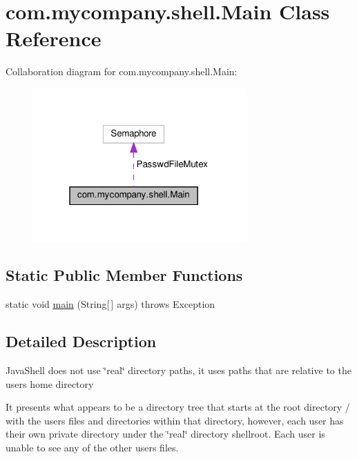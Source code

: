 \hypertarget{classcom_1_1mycompany_1_1shell_1_1Main}{}\section{com.\+mycompany.\+shell.\+Main Class Reference}
\label{classcom_1_1mycompany_1_1shell_1_1Main}


Collaboration diagram for com.\+mycompany.\+shell.\+Main\+:\nopagebreak
\begin{figure}[H]
\begin{center}
\leavevmode
\includegraphics[width=232pt]{classcom_1_1mycompany_1_1shell_1_1Main__coll__graph}
\end{center}
\end{figure}
\subsection*{Static Public Member Functions}
\begin{DoxyCompactItemize}
\item 
static void \hyperlink{classcom_1_1mycompany_1_1shell_1_1Main_af1528af6ecb9ddfad09364f6ee6fa706}{main} (String\mbox{[}$\,$\mbox{]} args)  throws Exception 
\end{DoxyCompactItemize}


\subsection{Detailed Description}
Java\+Shell does not use \char`\"{}real\char`\"{} directory paths, it uses paths that are relative to the users home directory

It presents what appears to be a directory tree that starts at the root directory / with the users files and directories within that directory, however, each user has their own private directory under the \char`\"{}real\char`\"{} directory shellroot. Each user is unable to see any of the other user\textquotesingle{}s files.

